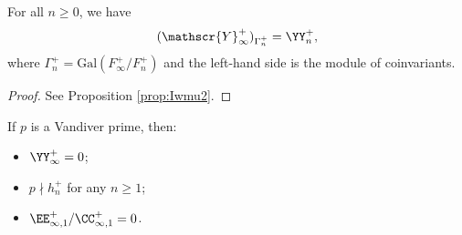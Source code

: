 \documentclass[a4paper,10pt, english, reqno]{smfart}
\newcommand{\GG}{\Gamma}
\numberwithin{equation}{section}
\begin{document}
\begin{proposition} \label{prop:coinvariants}
For all $n\geq 0$, we have
\[ (\mathscr{Y}^+_\infty)_{\GG^+_n} = \YY_n^+, \]
where  $\GG^+_n = \mathrm{Gal}(F^+_\infty / F^+_n)$ and the left-hand side is the module of coinvariants.
\end{proposition}

\begin{proof}
See Proposition \ref{prop:Iwmu2}.
\end{proof}

\begin{corollary} \label{cor:Iw1}
If $p$ is a Vandiver prime, then:
\begin{itemize}
\item[(i)] $\YY_\infty^+ = 0$;
\item[(ii)] $p \nmid h_n^+$ for any $n \geq 1$;
\item[(iii)] $\EE^+_{\infty, 1} / \CC^+_{\infty, 1} = 0$.
\end{itemize}
\end{corollary}
\end{document}
